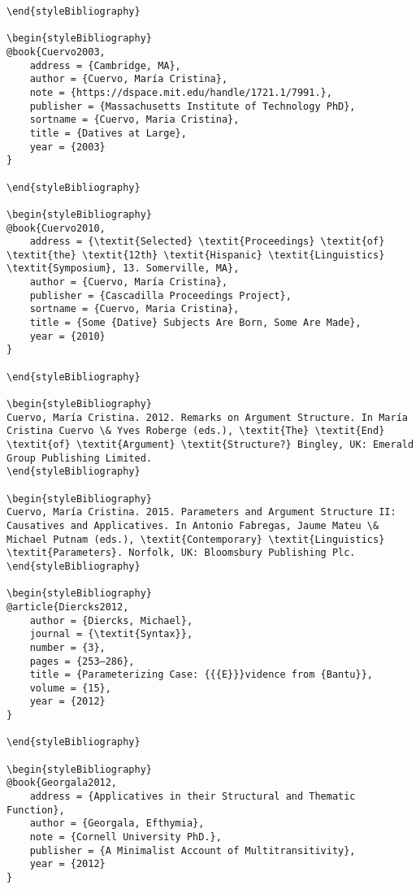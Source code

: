 \documentclass[output=paper,modfonts,nonflat]{langsci/langscibook}
\begin{document}
\begin{verbatim}
\end{styleBibliography}

\begin{styleBibliography}
@book{Cuervo2003,
	address = {Cambridge, MA},
	author = {Cuervo, María Cristina},
	note = {https://dspace.mit.edu/handle/1721.1/7991.},
	publisher = {Massachusetts Institute of Technology PhD},
	sortname = {Cuervo, Maria Cristina},
	title = {Datives at Large},
	year = {2003}
}

\end{styleBibliography}

\begin{styleBibliography}
@book{Cuervo2010,
	address = {\textit{Selected} \textit{Proceedings} \textit{of} \textit{the} \textit{12th} \textit{Hispanic} \textit{Linguistics} \textit{Symposium}, 13. Somerville, MA},
	author = {Cuervo, María Cristina},
	publisher = {Cascadilla Proceedings Project},
	sortname = {Cuervo, Maria Cristina},
	title = {Some {Dative} Subjects Are Born, Some Are Made},
	year = {2010}
}

\end{styleBibliography}

\begin{styleBibliography}
Cuervo, María Cristina. 2012. Remarks on Argument Structure. In María Cristina Cuervo \& Yves Roberge (eds.), \textit{The} \textit{End} \textit{of} \textit{Argument} \textit{Structure?} Bingley, UK: Emerald Group Publishing Limited.
\end{styleBibliography}

\begin{styleBibliography}
Cuervo, María Cristina. 2015. Parameters and Argument Structure II: Causatives and Applicatives. In Antonio Fabregas, Jaume Mateu \& Michael Putnam (eds.), \textit{Contemporary} \textit{Linguistics} \textit{Parameters}. Norfolk, UK: Bloomsbury Publishing Plc.
\end{styleBibliography}

\begin{styleBibliography}
@article{Diercks2012,
	author = {Diercks, Michael},
	journal = {\textit{Syntax}},
	number = {3},
	pages = {253–286},
	title = {Parameterizing Case: {{{E}}}vidence from {Bantu}},
	volume = {15},
	year = {2012}
}

\end{styleBibliography}

\begin{styleBibliography}
@book{Georgala2012,
	address = {Applicatives in their Structural and Thematic Function},
	author = {Georgala, Efthymia},
	note = {Cornell University PhD.},
	publisher = {A Minimalist Account of Multitransitivity},
	year = {2012}
}


\end{verbatim}
\end{document}
